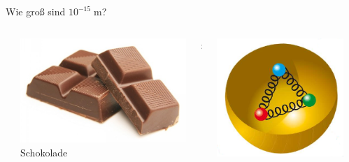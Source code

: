 \documentclass{beamer}
\newcommand{\m}{\ensuremath{\;\text{m}}\xspace}
\begin{document}
\begin{frame}
\begin{columns}[T]
\begin{column}{0.25\textwidth}
    \end{column}
    \begin{column}{0.75\textwidth}
      \centering
      \alert{Wie gro\ss{} sind $10^{-15}\m$?}
      \begin{columns}
        \begin{column}{0.1\textwidth}
        \end{column}
        \begin{column}{0.35\textwidth}
          \centering
          \includegraphics[height=0.18\textheight]{matter/schokolade.jpg}\\
          Schokolade
        \end{column}
        \begin{column}{0.1\textwidth}
          \centering
          {\Huge :}
        \end{column}
        \begin{column}{0.35\textwidth}
          \centering
          \includegraphics[height=0.18\textheight]{matter/Proton.png}\\

\end{column}
\end{columns}
\end{column}
\end{columns}
\end{frame}
\end{document}

